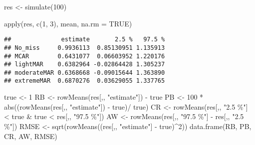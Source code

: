 \documentclass[
]{article}
\newenvironment{Shaded}{\begin{snugshade}}{\end{snugshade}}
\newcommand{\AttributeTok}[1]{\textcolor[rgb]{0.77,0.63,0.00}{#1}}
\newcommand{\ConstantTok}[1]{\textcolor[rgb]{0.00,0.00,0.00}{#1}}
\newcommand{\DecValTok}[1]{\textcolor[rgb]{0.00,0.00,0.81}{#1}}
\newcommand{\FunctionTok}[1]{\textcolor[rgb]{0.00,0.00,0.00}{#1}}
\newcommand{\NormalTok}[1]{#1}
\newcommand{\OtherTok}[1]{\textcolor[rgb]{0.56,0.35,0.01}{#1}}
\newcommand{\SpecialCharTok}[1]{\textcolor[rgb]{0.00,0.00,0.00}{#1}}
\newcommand{\StringTok}[1]{\textcolor[rgb]{0.31,0.60,0.02}{#1}}
\begin{document}
\begin{Shaded}
\begin{Highlighting}[]
\NormalTok{res }\OtherTok{\textless{}{-}} \FunctionTok{simulate}\NormalTok{(}\DecValTok{100}\NormalTok{)}
\end{Highlighting}
\end{Shaded}

\begin{Shaded}
\begin{Highlighting}[]
\FunctionTok{apply}\NormalTok{(res, }\FunctionTok{c}\NormalTok{(}\DecValTok{1}\NormalTok{, }\DecValTok{3}\NormalTok{), mean, }\AttributeTok{na.rm =} \ConstantTok{TRUE}\NormalTok{)}
\end{Highlighting}
\end{Shaded}

\begin{verbatim}
##              estimate       2.5 %   97.5 %
## No_miss     0.9936113  0.85130951 1.135913
## MCAR        0.6431077  0.06603952 1.220176
## lightMAR    0.6382964 -0.02864428 1.305237
## moderateMAR 0.6368668 -0.09015644 1.363890
## extremeMAR  0.6870276  0.03629055 1.337765
\end{verbatim}

\begin{Shaded}
\begin{Highlighting}[]
\NormalTok{true }\OtherTok{\textless{}{-}} \DecValTok{1}
\NormalTok{RB }\OtherTok{\textless{}{-}} \FunctionTok{rowMeans}\NormalTok{(res[,, }\StringTok{"estimate"}\NormalTok{]) }\SpecialCharTok{{-}}\NormalTok{ true}
\NormalTok{PB }\OtherTok{\textless{}{-}} \DecValTok{100} \SpecialCharTok{*} \FunctionTok{abs}\NormalTok{((}\FunctionTok{rowMeans}\NormalTok{(res[,, }\StringTok{"estimate"}\NormalTok{]) }\SpecialCharTok{{-}}\NormalTok{ true)}\SpecialCharTok{/}\NormalTok{ true)}
\NormalTok{CR }\OtherTok{\textless{}{-}} \FunctionTok{rowMeans}\NormalTok{(res[,, }\StringTok{"2.5 \%"}\NormalTok{] }\SpecialCharTok{\textless{}}\NormalTok{ true }\SpecialCharTok{\&}\NormalTok{ true }\SpecialCharTok{\textless{}}\NormalTok{ res[,, }\StringTok{"97.5 \%"}\NormalTok{])}
\NormalTok{AW }\OtherTok{\textless{}{-}} \FunctionTok{rowMeans}\NormalTok{(res[,, }\StringTok{"97.5 \%"}\NormalTok{] }\SpecialCharTok{{-}}\NormalTok{ res[,, }\StringTok{"2.5 \%"}\NormalTok{])}
\NormalTok{RMSE }\OtherTok{\textless{}{-}} \FunctionTok{sqrt}\NormalTok{(}\FunctionTok{rowMeans}\NormalTok{((res[,, }\StringTok{"estimate"}\NormalTok{] }\SpecialCharTok{{-}}\NormalTok{ true)}\SpecialCharTok{\^{}}\DecValTok{2}\NormalTok{))}
\FunctionTok{data.frame}\NormalTok{(RB, PB, CR, AW, RMSE)}
\end{Highlighting}
\end{Shaded}
\end{document}
